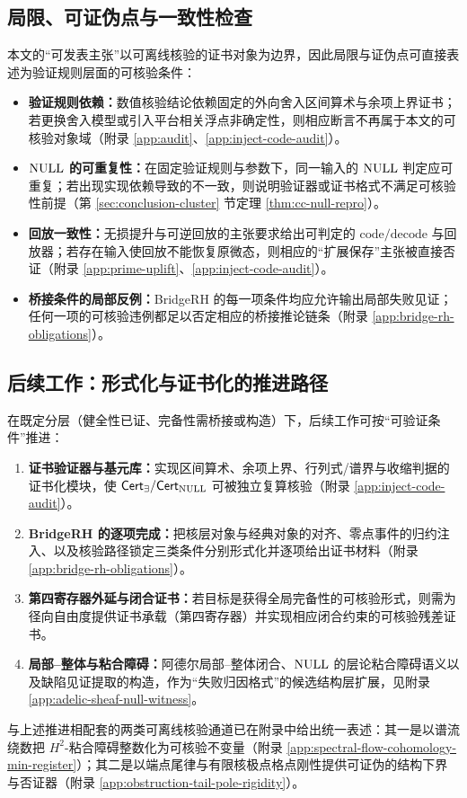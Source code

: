 \subsection{局限、可证伪点与一致性检查}
本文的“可发表主张”以可离线核验的证书对象为边界，因此局限与证伪点可直接表述为验证规则层面的可核验条件：
\begin{itemize}
  \item \textbf{验证规则依赖：}数值核验结论依赖固定的外向舍入区间算术与余项上界证书；若更换舍入模型或引入平台相关浮点非确定性，则相应断言不再属于本文的可核验对象域（附录 \ref{app:audit}、\ref{app:inject-code-audit}）。
  \item \textbf{$\mathrm{NULL}$ 的可重复性：}在固定验证规则与参数下，同一输入的 $\mathrm{NULL}$ 判定应可重复；若出现实现依赖导致的不一致，则说明验证器或证书格式不满足可核验性前提（第 \ref{sec:conclusion-cluster} 节定理 \ref{thm:cc-null-repro}）。
  \item \textbf{回放一致性：}无损提升与可逆回放的主张要求给出可判定的 $\mathrm{code}/\mathrm{decode}$ 与回放器；若存在输入使回放不能恢复原微态，则相应的“扩展保存”主张被直接否证（附录 \ref{app:prime-uplift}、\ref{app:inject-code-audit}）。
  \item \textbf{桥接条件的局部反例：}BridgeRH 的每一项条件均应允许输出局部失败见证；任何一项的可核验违例都足以否定相应的桥接推论链条（附录 \ref{app:bridge-rh-obligations}）。
\end{itemize}

\subsection{后续工作：形式化与证书化的推进路径}
在既定分层（健全性已证、完备性需桥接或构造）下，后续工作可按“可验证条件”推进：
\begin{enumerate}
  \item \textbf{证书验证器与基元库：}实现区间算术、余项上界、行列式/谱界与收缩判据的证书化模块，使 $\mathsf{Cert}_\exists/\mathsf{Cert}_{\mathrm{NULL}}$ 可被独立复算核验（附录 \ref{app:inject-code-audit}）。
  \item \textbf{BridgeRH 的逐项完成：}把核层对象与经典对象的对齐、零点事件的归约注入、以及核验路径锁定三类条件分别形式化并逐项给出证书材料（附录 \ref{app:bridge-rh-obligations}）。
  \item \textbf{第四寄存器外延与闭合证书：}若目标是获得全局完备性的可核验形式，则需为径向自由度提供证书承载（第四寄存器）并实现相应闭合约束的可核验残差证书。
  \item \textbf{局部--整体与粘合障碍：}阿德尔局部--整体闭合、$\mathrm{NULL}$ 的层论粘合障碍语义以及缺陷见证提取的构造，作为“失败归因格式”的候选结构层扩展，见附录 \ref{app:adelic-sheaf-null-witness}。
\end{enumerate}
\par
与上述推进相配套的两类可离线核验通道已在附录中给出统一表述：其一是以谱流绕数把 $H^2$-粘合障碍整数化为可核验不变量（附录 \ref{app:spectral-flow-cohomology-min-register}）；其二是以端点尾律与有限核极点格点刚性提供可证伪的结构下界与否证器（附录 \ref{app:obstruction-tail-pole-rigidity}）。

